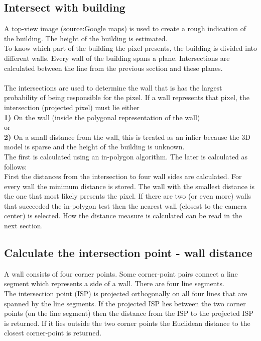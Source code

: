 \documentclass[10pt]{article}
\begin{document}
\subsection{Intersect with building}
A top-view image (source:Google maps) is used to create a rough indication of the building. The height of the building is estimated.\\
To know which part of the building the pixel presents, the building is divided into different walls.  Every wall of the building spans a plane. Intersections are calculated between the line from the previous section and these planes.\\
\\
The intersections are used to determine the wall that is has the largest probability of being responsible for the pixel. 
If a wall represents that pixel, the intersection (projected pixel) must lie either\\
\textbf{1)} On the wall (inside the polygonal representation of the wall)
\\
or
\\
\textbf{2)} On a small distance from the wall, this is treated as an inlier because the 3D model is sparse and the height of the building is unknown.
\\
The first is calculated using an in-polygon algorithm. The later is calculated as follows:
\\
First the distances from the intersection to four wall sides are calculated. For every wall the minimum distance is stored. The wall with the smallest distance is the one that most likely presents the pixel. If there are two (or even more) walls that succeeded the in-polygon test then the nearest wall (closest to the camera center) is selected. How the distance measure is calculated can be read in the next section.

\subsection{Calculate the intersection point - wall distance}
A wall consists of four corner points. Some corner-point pairs connect a line segment which represents a side of a wall. There are four line segments.\\
The intersection point (ISP) is projected orthogonally on all four lines that
are spanned by the line segments.  If the projected ISP lies between the two
corner points (on the line segment) then the distance from the ISP to the
projected ISP is returned.  If it lies outside the two corner points the
Euclidean distance to the closest corner-point is returned.
\end{document}
